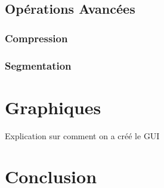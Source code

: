 \documentclass[12pt]{article}
\begin{document}
\subsection{Opérations Avancées}
\subsubsection{Compression}
\subsubsection{Segmentation}
\section{Graphiques}
Explication sur comment on a créé le GUI
\section*{Conclusion}
\end{document}
